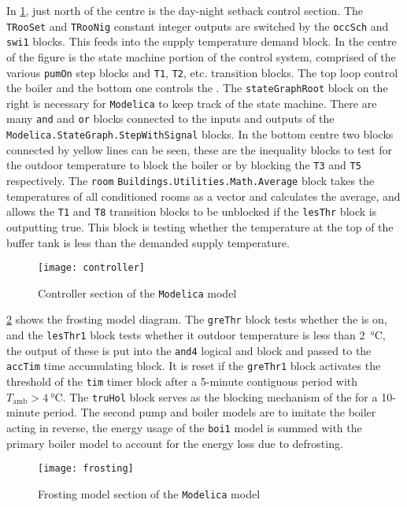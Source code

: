 In \cref{fig:controllersec}, just north of the centre is the day-night setback control section. The \texttt{TRooSet} and \texttt{TRooNig} constant integer outputs are switched by the \texttt{occSch} and \texttt{swi1} blocks. This feeds into the supply temperature demand block. In the centre of the figure is the state machine portion of the control system, comprised of the various \texttt{pumOn} step blocks and \texttt{T1}, \texttt{T2}, etc. transition blocks. The top loop control the boiler and the bottom one controls the \HP. The \texttt{stateGraphRoot} block on the right is necessary for \texttt{Modelica} to keep track of the state machine. There are many \texttt{and} and \texttt{or} blocks connected to the inputs and outputs of the \texttt{Modelica.StateGraph.StepWithSignal} blocks. In the bottom centre two blocks connected by yellow lines can be seen, these are the inequality blocks to test for the outdoor temperature to block the boiler or \HP by blocking the \texttt{T3} and \texttt{T5} respectively. The \texttt{room} \texttt{Buildings.Utilities.Math.Average} block takes the temperatures of all conditioned rooms as a vector and calculates the average, and allows the \texttt{T1} and \texttt{T8} transition blocks to be unblocked if the \texttt{lesThr} block is outputting true. This block is testing whether the temperature at the top of the buffer tank is less than the demanded supply temperature. 
\begin{figure}[htb]
    \centering
    \texttt{[image: controller]}
    \caption{Controller section of the \texttt{Modelica} model}
    \label{fig:controllersec}
\end{figure}

\cref{fig:frostingmodelsec} shows the frosting model diagram. The \texttt{greThr} block tests whether the \HP is on, and the \texttt{lesThr1} block tests whether it outdoor temperature is less than \qty{2}{\celsius}, the output of these is put into the \texttt{and4} logical and block and passed to the \texttt{accTim} time accumulating block. It is reset if the \texttt{greThr1} block activates the threshold of the \texttt{tim} timer block after a 5-minute contiguous period with $T_\text{amb}>\qty{4}{\celsius}$. The \texttt{truHol} block serves as the blocking mechanism of the \HP for a 10-minute period. The second pump and boiler models are to imitate the boiler acting in reverse, the energy usage of the \texttt{boi1} model is summed with the primary boiler model to account for the energy loss due to defrosting. 
\begin{figure}[htb]
    \centering
    \texttt{[image: frosting]}
    \caption{Frosting model section of the \texttt{Modelica} model}
    \label{fig:frostingmodelsec}
\end{figure}

